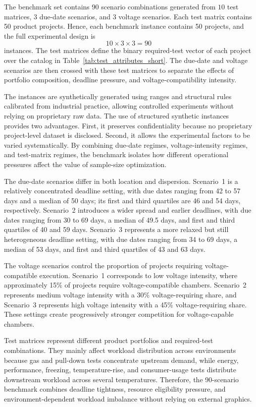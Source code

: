 \documentclass[11pt]{article}
\begin{document}
The benchmark set contains 90 scenario combinations generated from \(10\) test matrices, \(3\) due-date scenarios, and \(3\) voltage scenarios. Each test matrix contains 50 product projects. Hence, each benchmark instance contains 50 projects, and the full experimental design is
\[
10 \times 3 \times 3 = 90
\]
instances. The test matrices define the binary required-test vector of each project over the catalog in Table~\ref{tab:test_attributes_short}. The due-date and voltage scenarios are then crossed with these test matrices to separate the effects of portfolio composition, deadline pressure, and voltage-compatibility intensity.

The instances are synthetically generated using ranges and structural rules calibrated from industrial practice, allowing controlled experiments without relying on proprietary raw data. The use of structured synthetic instances provides two advantages. First, it preserves confidentiality because no proprietary project-level dataset is disclosed. Second, it allows the experimental factors to be varied systematically. By combining due-date regimes, voltage-intensity regimes, and test-matrix regimes, the benchmark isolates how different operational pressures affect the value of sample-size optimization.

The due-date scenarios differ in both location and dispersion. Scenario~1 is a relatively concentrated deadline setting, with due dates ranging from 42 to 57 days and a median of 50 days; its first and third quartiles are 46 and 54 days, respectively. Scenario~2 introduces a wider spread and earlier deadlines, with due dates ranging from 30 to 69 days, a median of 49.5 days, and first and third quartiles of 40 and 59 days. Scenario~3 represents a more relaxed but still heterogeneous deadline setting, with due dates ranging from 34 to 69 days, a median of 53 days, and first and third quartiles of 43 and 63 days.

The voltage scenarios control the proportion of projects requiring voltage-compatible execution. Scenario~1 corresponds to low voltage intensity, where approximately 15\% of projects require voltage-compatible chambers. Scenario~2 represents medium voltage intensity with a 30\% voltage-requiring share, and Scenario~3 represents high voltage intensity with a 45\% voltage-requiring share. These settings create progressively stronger competition for voltage-capable chambers.

Test matrices represent different product portfolios and required-test combinations. They mainly affect workload distribution across environments because gas and pull-down tests concentrate upstream demand, while energy, performance, freezing, temperature-rise, and consumer-usage tests distribute downstream workload across several temperatures. Therefore, the 90-scenario benchmark combines deadline tightness, resource eligibility pressure, and environment-dependent workload imbalance without relying on external graphics.
\end{document}

